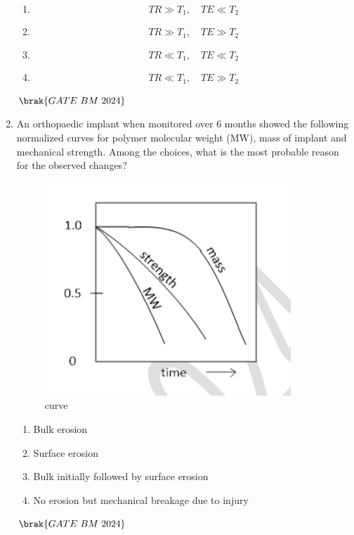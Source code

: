 \documentclass[journal,12pt,onecolumn]{IEEEtran}
\theoremstyle{remark}
\begin{document}
\begin{enumerate}
\begin{enumerate}[label=(\Alph*)]
    \item \[
TR \gg T_1, \quad TE \ll T_2
\]

\item \[
TR \gg T_1, \quad TE \gg T_2
\]

\item \[
TR \ll T_1, \quad TE \ll T_2
\]

\item \[
TR \ll T_1, \quad TE \gg T_2
\]
\end{enumerate}
\hfill $\brak{GATE\ BM\ 2024}$

\item An orthopaedic implant when monitored over 6 months showed the following
normalized curves for polymer molecular weight (MW), mass of implant and
mechanical strength. Among the choices, what is the most probable reason for the
observed changes?
\begin{figure}[H]
\centering
\includegraphics[width=0.4\columnwidth]{Figs/Fig 8.png}
\caption{curve}
\label{fig:placeholder}
\end{figure}
\begin{enumerate}[label=(\Alph*)]
    \item Bulk erosion
    \item Surface erosion
    \item Bulk initially followed by surface erosion
    \item No erosion but mechanical breakage due to injury
\end{enumerate}
\hfill $\brak{GATE\ BM\ 2024}$


\end{enumerate}
\end{document}
